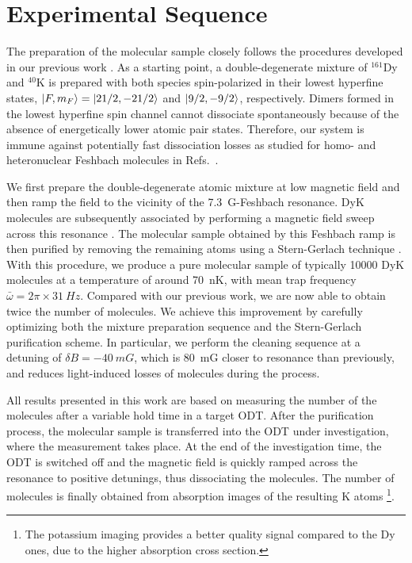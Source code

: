 \section{Experimental Sequence}
\label{Sec:SamplePrep}

The preparation of the molecular sample closely follows the procedures developed in our previous work \cite{Ravensbergen2018poa, Ye2022ool, Soave2023otf}. As a starting point, a double-degenerate mixture of $^{161}$Dy and $^{40}$K is prepared with both species spin-polarized in their lowest hyperfine states, $\ket{F,m_F}=\ket{21/2,-21/2}$ and $\ket{9/2,-9/2}$, respectively. 
{Dimers formed in the lowest hyperfine spin channel cannot dissociate spontaneously because of the absence of energetically lower atomic pair states. Therefore, our system is immune against potentially fast dissociation losses as studied for homo- and heteronuclear Feshbach molecules in Refs.~\cite{Thompson2005sdo, Jag2016lof}.
}

We first prepare the double-degenerate atomic mixture at low magnetic field and then ramp the field to the vicinity of the \SI{7.3}{G}-Feshbach resonance. DyK molecules are subsequently associated by performing a magnetic field sweep across this resonance \cite{Chin2010fri, Soave2023otf}. The molecular sample obtained by this Feshbach ramp is then purified by removing the remaining atoms using a Stern-Gerlach technique \cite{Soave2023otf}. 
With this procedure, we produce a pure molecular sample of typically \SI{10000}{} DyK molecules at a temperature of around \SI{70}{nK}, with mean trap frequency  $\bar\omega=2\pi\times\SI{31}{Hz}$. Compared with our previous work, we are now able to obtain twice the number of molecules. We achieve this improvement by carefully optimizing both the mixture preparation sequence and  the Stern-Gerlach purification scheme. In particular, we perform the cleaning sequence at a detuning of $\delta B=\SI{-40}{mG}$, which is \SI{80}{mG} closer to resonance than previously, and reduces light-induced losses of molecules during the process. 

All results presented in this work are based on measuring the number of the molecules after a variable hold time in a target ODT. After the purification process, the molecular sample is transferred into the ODT under investigation, where the measurement takes place. At the end of the investigation time, the ODT is switched off and the magnetic field is quickly ramped across the resonance to positive detunings, thus dissociating the molecules. The number of molecules is finally obtained from absorption images of the resulting K atoms \footnote{The potassium imaging provides a better quality signal compared to the Dy ones, due to the  higher absorption cross section.}.


